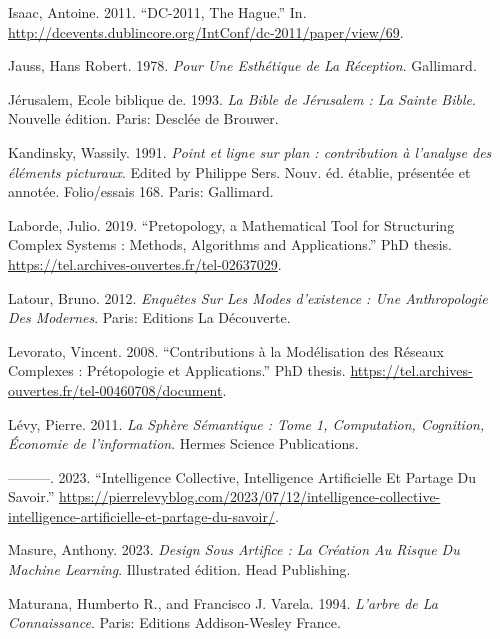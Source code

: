 \documentclass[
  letterpaper,
  DIV=11,
  numbers=noendperiod]{scrreprt}
\newlength{\cslhangindent}
\newlength{\cslentryspacingunit} %
\newenvironment{CSLReferences}[2] %
 {%
  \setlength{\parindent}{0pt}
  \ifodd #1
  \let\oldpar\par
  \def\par{\hangindent=\cslhangindent\oldpar}
  \fi
  \setlength{\parskip}{#2\cslentryspacingunit}
 }%
 {}
\begin{document}
\begin{CSLReferences}{1}{0}
\leavevmode{}%
Isaac, Antoine. 2011. {``DC-2011, The Hague.''} In.
\url{http://dcevents.dublincore.org/IntConf/dc-2011/paper/view/69}.

\leavevmode{}%
Jauss, Hans Robert. 1978. \emph{Pour Une Esthétique de La Réception}.
Gallimard.

\leavevmode{}%
Jérusalem, Ecole biblique de. 1993. \emph{La Bible de Jérusalem : La
Sainte Bible}. Nouvelle édition. Paris: Desclée de Brouwer.

\leavevmode{}%
Kandinsky, Wassily. 1991. \emph{Point et ligne sur plan : contribution à
l'analyse des éléments picturaux}. Edited by Philippe Sers. Nouv. éd.
établie, présentée et annotée. Folio/essais 168. Paris: Gallimard.

\leavevmode{}%
Laborde, Julio. 2019. {``Pretopology, a Mathematical Tool for
Structuring Complex Systems : Methods, Algorithms and Applications.''}
PhD thesis. \url{https://tel.archives-ouvertes.fr/tel-02637029}.

\leavevmode{}%
Latour, Bruno. 2012. \emph{Enquêtes Sur Les Modes d'existence : Une
Anthropologie Des Modernes}. Paris: Editions La Découverte.

\leavevmode{}%
Levorato, Vincent. 2008. {``Contributions à la Modélisation des Réseaux
Complexes : Prétopologie et Applications.''} PhD thesis.
\url{https://tel.archives-ouvertes.fr/tel-00460708/document}.

\leavevmode{}%
Lévy, Pierre. 2011. \emph{La Sphère Sémantique : Tome 1, Computation,
Cognition, Économie de l'information}. Hermes Science Publications.

\leavevmode{}%
---------. 2023. {``Intelligence Collective, Intelligence Artificielle
Et Partage Du Savoir.''}
\url{https://pierrelevyblog.com/2023/07/12/intelligence-collective-intelligence-artificielle-et-partage-du-savoir/}.

\leavevmode{}%
Masure, Anthony. 2023. \emph{Design Sous Artifice : La Création Au
Risque Du Machine Learning}. Illustrated édition. Head Publishing.

\leavevmode{}%
Maturana, Humberto R., and Francisco J. Varela. 1994. \emph{L'arbre de
La Connaissance}. Paris: Editions Addison-Wesley France.


\end{CSLReferences}
\end{document}
